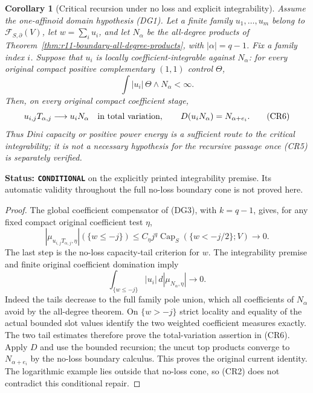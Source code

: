 \documentclass[11pt,a4paper]{article}
\numberwithin{equation}{section}
\newtheorem{corollary}[theorem]{Corollary}
\theoremstyle{definition}
\theoremstyle{remark}
\begin{document}
\begin{corollary}[Critical recursion under no loss and explicit integrability]
\label{cor:r11-critical-recursion-if-integrable}
Assume the one-affinoid domain hypothesis (DG1). Let a finite
family $u_1,\ldots,u_m$ belong to
$\mathcal F_{S,\partial}(V)$, let $w=\sum_i u_i$, and let
$N_\alpha$ be the all-degree products of
Theorem~\ref{thm:r11-boundary-all-degree-products}, with
$|\alpha|=q-1$. Fix a family index $i$. Suppose that
$u_i$ is locally coefficient-integrable against $N_\alpha$:
for every original compact positive complementary $(1,1)$
control $\Theta$,
\[
                   \int |u_i|\,\Theta\wedge N_\alpha<\infty.
 \tag{CR5}
\]
Then, on every original compact coefficient stage,
\[
             u_{i,j}T_{\alpha,j}\longrightarrow u_iN_\alpha
                          \quad\hbox{in total variation},
 \qquad D(u_iN_\alpha)=N_{\alpha+e_i}.
 \tag{CR6}
\]
Thus Dini capacity or positive power energy is a sufficient route
to the critical integrability; it is not a necessary hypothesis
for the recursive passage once (CR5) is separately verified.
\end{corollary}

\noindent\textbf{Status: \texttt{CONDITIONAL}} on the explicitly
printed integrability premise. Its automatic validity throughout
the full no-loss boundary cone is not proved here.

\begin{proof}
The global coefficient compensator of (DG3), with $k=q-1$,
gives, for any fixed compact original coefficient test $\eta$,
\[
 \left|\mu_{u_{i,j}T_{\alpha,j},\eta}\right|
                         (\{w\leq-j\})
 \leq C_\eta j^q\operatorname{Cap}_S(\{w<-j/2\};V)
                                             \longrightarrow0.
 \tag{CR7}
\]
The last step is the no-loss capacity-tail criterion for $w$.
The integrability premise and finite original coefficient
domination imply
\[
             \int_{\{w\leq-j\}}|u_i|\,d|\mu_{N_\alpha,\eta}|
                                                   \longrightarrow0.
\]
Indeed the tails decrease to the full family pole union, which
all coefficients of $N_\alpha$ avoid by the all-degree theorem.
On $\{w>-j\}$ strict locality and equality of the actual
bounded slot values identify the two weighted coefficient
measures exactly. The two tail estimates therefore prove
the total-variation assertion in (CR6). Apply $D$ and use
the bounded recursion; the uncut top products converge to
$N_{\alpha+e_i}$ by the no-loss boundary calculus. This proves
the original current identity. The logarithmic example lies
outside that no-loss cone, so (CR2) does not contradict this
conditional repair.
\end{proof}
\end{document}
